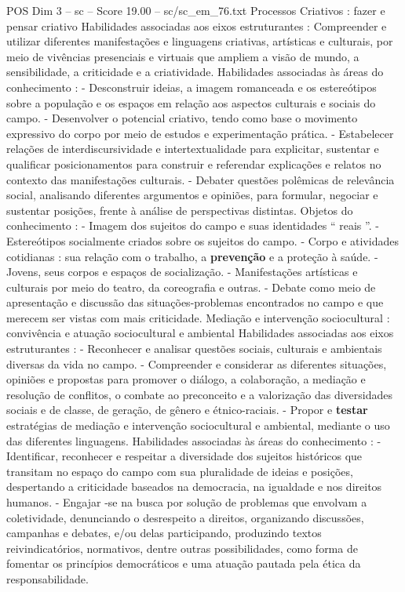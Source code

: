 \begin{textsample}{POS Dim 3 – sc – Score 19.00 – sc/sc\_em\_76.txt}
Processos Criativos : fazer e pensar criativo Habilidades associadas aos eixos estruturantes : Compreender e utilizar diferentes manifestações e linguagens criativas, artísticas e culturais, por meio de vivências presenciais e virtuais que ampliem a visão de mundo, a sensibilidade, a criticidade e a criatividade.
Habilidades associadas às áreas do conhecimento : - Desconstruir ideias, a imagem romanceada e os estereótipos sobre a população e os espaços em relação aos aspectos culturais e sociais do campo. - Desenvolver o potencial criativo, tendo como base o movimento expressivo do corpo por meio de estudos e experimentação prática. - Estabelecer relações de interdiscursividade e intertextualidade para explicitar, sustentar e qualificar posicionamentos para construir e referendar explicações e relatos no contexto das manifestações culturais. - Debater questões polêmicas de relevância social, analisando diferentes argumentos e opiniões, para formular, negociar e sustentar posições, frente à análise de perspectivas distintas.
Objetos do conhecimento : - Imagem dos sujeitos do campo e suas identidades “ reais ”. - Estereótipos socialmente criados sobre os sujeitos do campo. - Corpo e atividades cotidianas : sua relação com o trabalho, a \textbf{prevenção} e a proteção à saúde. - Jovens, seus corpos e espaços de socialização. - Manifestações artísticas e culturais por meio do teatro, da coreografia e outras. - Debate como meio de apresentação e discussão das situações-problemas encontrados no campo e que merecem ser vistas com mais criticidade.
Mediação e intervenção sociocultural : convivência e atuação sociocultural e ambiental Habilidades associadas aos eixos estruturantes : - Reconhecer e analisar questões sociais, culturais e ambientais diversas da vida no campo. - Compreender e considerar as diferentes situações, opiniões e propostas para promover o diálogo, a colaboração, a mediação e resolução de conflitos, o combate ao preconceito e a valorização das diversidades sociais e de classe, de geração, de gênero e étnico-raciais. - Propor e \textbf{testar} estratégias de mediação e intervenção sociocultural e ambiental, mediante o uso das diferentes linguagens.
Habilidades associadas às áreas do conhecimento : - Identificar, reconhecer e respeitar a diversidade dos sujeitos históricos que transitam no espaço do campo com sua pluralidade de ideias e posições, despertando a criticidade baseados na democracia, na igualdade e nos direitos humanos. - Engajar -se na busca por solução de problemas que envolvam a coletividade, denunciando o desrespeito a direitos, organizando discussões, campanhas e debates, e/ou delas participando, produzindo textos reivindicatórios, normativos, dentre outras possibilidades, como forma de fomentar os princípios democráticos e uma atuação pautada pela ética da responsabilidade.

\end{textsample}
